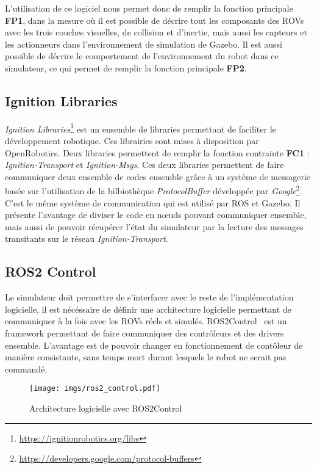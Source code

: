            L'utilisation de ce logiciel nous permet donc de remplir la fonction principale \textbf{FP1}, dans la mesure où il est possible de décrire tout les composants des \gls{ROV}s avec les trois couches visuelles, de collision et d'inertie, mais aussi les capteurs et les actionneurs dans l'environnement de simulation de \gls{Gazebo}. Il est aussi possible de décrire le comportement de l'environnement du robot dans ce simulateur, ce qui permet de remplir la fonction principale \textbf{FP2}.

        \subsection{Ignition Libraries}

            \textit{Ignition Libraries}\footnote{\url{https://ignitionrobotics.org/libs}} est un ensemble de libraries permettant de faciliter le développement robotique. Ces librairies sont mises à disposition par \gls{OpenRobotics}. Deux libraries permettent de remplir la fonction contrainte \textbf{FC1} : \textit{Ignition-Transport} et \textit{Ignition-Msgs}. Ces deux libraries permettent de faire communiquer deux ensemble de codes ensemble grâce à un système de messagerie basée sur l'utilisation de la bilbiothèque \textit{ProtocolBuffer} développée par \textit{Google}\footnote{\url{https://developers.google.com/protocol-buffers}}. C'est le même système de communication qui est utilisé par \gls{ROS} et \gls{Gazebo}. Il présente l'avantage de diviser le code en n\oe uds pouvant communiquer ensemble, mais aussi de pouvoir récupérer l'état du simulateur par la lecture des messages transitants sur le réseau \textit{Ignition-Transport}.

        \subsection{ROS2 Control}

            Le simulateur doit permettre de s'interfacer avec le reste de l'implémentation logicielle, il est nécéssaire de définir une architecture logicielle permettant de communiquer à la fois avec les \gls{ROV}s réels et simulés. \gls{ROS2Control}~\cite{ros_control} est un framework permettant de faire communiquer des contrôleurs et des drivers ensemble. L'avantage est de pouvoir changer en fonctionnement de contôleur de manière consistante, sans temps mort durant lesquels le robot ne serait pas commandé.

            \begin{figure}[!htb]
                \centering
                \texttt{[image: imgs/ros2\_control.pdf]}
                \caption{Architecture logicielle avec \gls{ROS2Control}}
                \label{fig:ros2_control}
            \end{figure}


